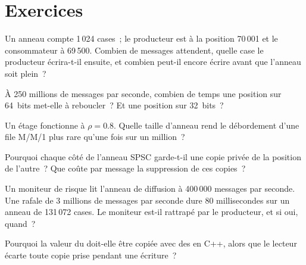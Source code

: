 \section{Exercices}

\begin{exercise}[$\star$]\label{exo:ll:queues-ring-buffers-and-shared-memory:1}
Un anneau compte 1\,024 cases~; le producteur est à la position 70\,001 et le consommateur à 69\,500. Combien de messages attendent, quelle case
le producteur écrira-t-il ensuite, et combien peut-il encore écrire avant que l'anneau soit plein~?
\end{exercise}

\begin{exercise}[$\star$]\label{exo:ll:queues-ring-buffers-and-shared-memory:2}
À 250 millions de messages par seconde, combien de temps une position sur 64~bits met-elle à reboucler~? Et une position sur 32~bits~?
\end{exercise}

\begin{exercise}[$\star$]\label{exo:ll:queues-ring-buffers-and-shared-memory:3}
Un étage fonctionne à $\rho = 0.8$. Quelle taille d'anneau rend le débordement d'une file M/M/1 plus rare qu'une fois sur un million~?
\end{exercise}

\begin{exercise}[$\star\star$]\label{exo:ll:queues-ring-buffers-and-shared-memory:4}
Pourquoi chaque côté de l'anneau SPSC garde-t-il une copie privée de la position de l'autre~? Que coûte par message la suppression de ces copies~?
\end{exercise}

\begin{exercise}[$\star\star$]\label{exo:ll:queues-ring-buffers-and-shared-memory:5}
Un moniteur de risque lit l'anneau de diffusion à 400\,000 messages par seconde. Une rafale de 3 millions de messages par seconde dure 80
millisecondes sur un anneau de 131\,072 cases. Le moniteur est-il rattrapé par le producteur, et si oui, quand~?
\end{exercise}

\begin{exercise}[$\star\star$]\label{exo:ll:queues-ring-buffers-and-shared-memory:6}
Pourquoi la valeur du  doit-elle être copiée avec des  en C++, alors que le lecteur écarte toute copie prise pendant une
écriture~?
\end{exercise}

